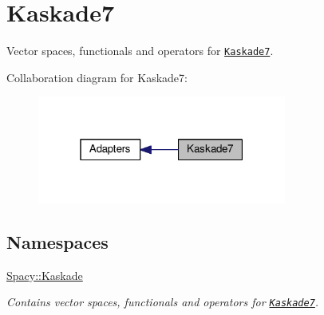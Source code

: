 \hypertarget{group__KaskadeGroup}{\section{Kaskade7}
\label{group__KaskadeGroup}
}


Vector spaces, functionals and operators for \href{http://www.zib.de/projects/kaskade7-finite-element-toolbox}{\tt Kaskade7}.  


Collaboration diagram for Kaskade7\-:
\nopagebreak
\begin{figure}[H]
\begin{center}
\leavevmode
\includegraphics[width=232pt]{group__KaskadeGroup}
\end{center}
\end{figure}
\subsection*{Namespaces}
\begin{DoxyCompactItemize}
\item 
\hyperlink{namespaceSpacy_1_1Kaskade}{Spacy\-::\-Kaskade}
\begin{DoxyCompactList}\small\item\em Contains vector spaces, functionals and operators for \href{http://www.zib.de/projects/kaskade7-finite-element-toolbox}{\tt Kaskade7}. \end{DoxyCompactList}\end{DoxyCompactItemize}
